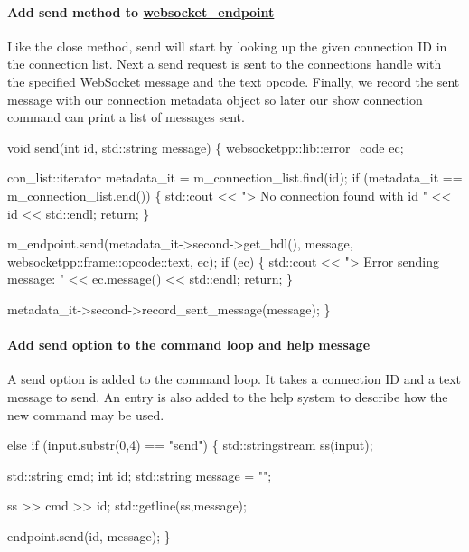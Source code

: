 \paragraph*{Add send method to {\ttfamily \hyperlink{classwebsocket__endpoint}{websocket\+\_\+endpoint}}}

Like the close method, send will start by looking up the given connection ID in the connection list. Next a send request is sent to the connection\textquotesingle{}s handle with the specified Web\+Socket message and the text opcode. Finally, we record the sent message with our connection metadata object so later our show connection command can print a list of messages sent.


\begin{DoxyCode}
\textcolor{keywordtype}{void} send(\textcolor{keywordtype}{int} \textcolor{keywordtype}{id}, std::string message) \{
    websocketpp::lib::error\_code ec;

    con\_list::iterator metadata\_it = m\_connection\_list.find(\textcolor{keywordtype}{id});
    \textcolor{keywordflow}{if} (metadata\_it == m\_connection\_list.end()) \{
        std::cout << \textcolor{stringliteral}{"> No connection found with id "} << \textcolor{keywordtype}{id} << std::endl;
        \textcolor{keywordflow}{return};
    \}

    m\_endpoint.send(metadata\_it->second->get\_hdl(), message, websocketpp::frame::opcode::text, ec);
    \textcolor{keywordflow}{if} (ec) \{
        std::cout << \textcolor{stringliteral}{"> Error sending message: "} << ec.message() << std::endl;
        \textcolor{keywordflow}{return};
    \}

    metadata\_it->second->record\_sent\_message(message);
\}
\end{DoxyCode}


\paragraph*{Add send option to the command loop and help message}

A send option is added to the command loop. It takes a connection ID and a text message to send. An entry is also added to the help system to describe how the new command may be used.


\begin{DoxyCode}
\textcolor{keywordflow}{else} \textcolor{keywordflow}{if} (input.substr(0,4) == \textcolor{stringliteral}{"send"}) \{
    std::stringstream ss(input);

        std::string cmd;
        \textcolor{keywordtype}{int} id;
        std::string message = \textcolor{stringliteral}{""};

        ss >> cmd >> id;
        std::getline(ss,message);

        endpoint.send(\textcolor{keywordtype}{id}, message);
\}
\end{DoxyCode}


